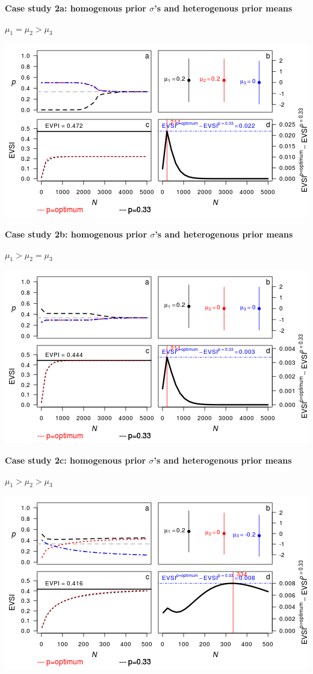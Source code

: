 \documentclass[]{article}
\theoremstyle{definition}
\theoremstyle{definition}
\theoremstyle{remark}
\begin{document}
\textbf{Case study 2a: homogenous prior \(\sigma\)'s and heterogenous
prior means}

\(\mu_1 = \mu_2 > \mu_3\)

\includegraphics{figure/x110_1_1_1c-1.png} \clearpage

\textbf{Case study 2b: homogenous prior \(\sigma\)'s and heterogenous
prior means}

\(\mu_1 > \mu_2 = \mu_3\)

\includegraphics{figure/x100_1_1_1c-1.png} \clearpage

\textbf{Case study 2c: homogenous prior \(\sigma\)'s and heterogenous
prior means}

\(\mu_1 > \mu_2 > \mu_3\)

\includegraphics{figure/x10n1_1_1_1c-1.png} \clearpage
\end{document}
